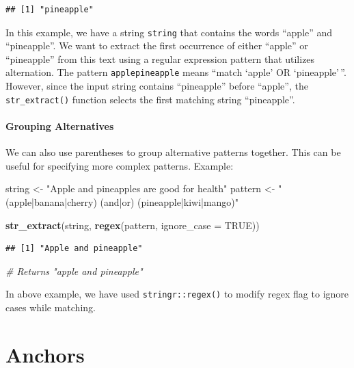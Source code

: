 \documentclass[
]{book}
\newenvironment{Shaded}{\begin{snugshade}}{\end{snugshade}}
\newcommand{\AttributeTok}[1]{\textcolor[rgb]{0.13,0.29,0.53}{#1}}
\newcommand{\CommentTok}[1]{\textcolor[rgb]{0.56,0.35,0.01}{\textit{#1}}}
\newcommand{\ConstantTok}[1]{\textcolor[rgb]{0.56,0.35,0.01}{#1}}
\newcommand{\FunctionTok}[1]{\textcolor[rgb]{0.13,0.29,0.53}{\textbf{#1}}}
\newcommand{\NormalTok}[1]{#1}
\newcommand{\OtherTok}[1]{\textcolor[rgb]{0.56,0.35,0.01}{#1}}
\newcommand{\StringTok}[1]{\textcolor[rgb]{0.31,0.60,0.02}{#1}}
\begin{document}
\begin{verbatim}
## [1] "pineapple"
\end{verbatim}

In this example, we have a string \texttt{string} that contains the words ``apple'' and ``pineapple''. We want to extract the first occurrence of either ``apple'' or ``pineapple'' from this text using a regular expression pattern that utilizes alternation. The pattern \texttt{apple\textbar{}pineapple} means ``match `apple' OR `pineapple'\,''. However, since the input string contains ``pineapple'' before ``apple'', the \texttt{str\_extract()} function selects the first matching string ``pineapple''.

\hypertarget{grouping-alternatives}{%
\paragraph{Grouping Alternatives}\label{grouping-alternatives}}

We can also use parentheses to group alternative patterns together. This can be useful for specifying more complex patterns. Example:

\begin{Shaded}
\begin{Highlighting}[]
\NormalTok{string }\OtherTok{\textless{}{-}} \StringTok{"Apple and pineapples are good for health"}
\NormalTok{pattern }\OtherTok{\textless{}{-}} \StringTok{"(apple|banana|cherry) (and|or) (pineapple|kiwi|mango)"}

\FunctionTok{str\_extract}\NormalTok{(string, }\FunctionTok{regex}\NormalTok{(pattern, }\AttributeTok{ignore\_case =} \ConstantTok{TRUE}\NormalTok{))}
\end{Highlighting}
\end{Shaded}

\begin{verbatim}
## [1] "Apple and pineapple"
\end{verbatim}

\begin{Shaded}
\begin{Highlighting}[]
\CommentTok{\# Returns "apple and pineapple"}
\end{Highlighting}
\end{Shaded}

In above example, we have used \texttt{stringr::regex()} to modify regex flag to ignore cases while matching.

\hypertarget{anchors}{%
\section{Anchors}\label{anchors}}
\end{document}
